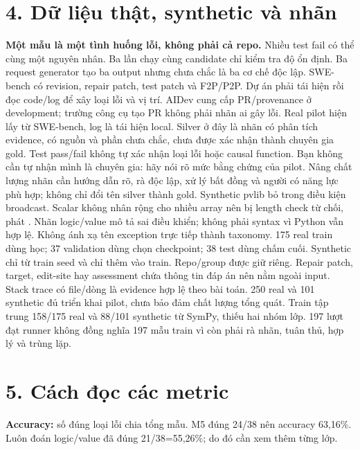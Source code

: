 \documentclass[12pt,a4paper]{article}
\begin{document}
\section*{4. Dữ liệu thật, synthetic và nhãn}
\textbf{Một mẫu là một tình huống lỗi, không phải cả repo.} Nhiều test fail có thể cùng một nguyên nhân. Ba lần chạy cùng candidate chỉ kiểm tra độ ổn định. Ba request generator tạo ba output nhưng chưa chắc là ba cơ chế độc lập.
SWE-bench có revision, repair patch, test patch và F2P/P2P. Dự án phải tái hiện rồi đọc code/log để xây loại lỗi và vị trí. AIDev cung cấp PR/provenance ở development; trường công cụ tạo PR không phải nhãn ai gây lỗi. Real pilot hiện lấy từ SWE-bench, log là tái hiện local.
Silver ở đây là nhãn có phân tích evidence, có nguồn và phần chưa chắc, chưa được xác nhận thành chuyên gia gold. Test pass/fail không tự xác nhận loại lỗi hoặc causal function. Bạn không cần tự nhận mình là chuyên gia: hãy nói rõ mức bằng chứng của pilot. Nâng chất lượng nhãn cần hướng dẫn rõ, rà độc lập, xử lý bất đồng và người có năng lực phù hợp; không chỉ đổi tên silver thành gold.
Synthetic pvlib bỏ  trong điều kiện broadcast. Scalar không nhân rộng cho nhiều array nên bị length check từ chối, phát . Nhãn logic/value mô tả sai điều khiển; không phải syntax vì Python vẫn hợp lệ. Không ánh xạ tên exception trực tiếp thành taxonomy.
175 real train dùng học; 37 validation dùng chọn checkpoint; 38 test dùng chấm cuối. Synthetic chỉ từ train seed và chỉ thêm vào train. Repo/group được giữ riêng. Repair patch, target, edit-site hay assessment chứa thông tin đáp án nên nằm ngoài input. Stack trace có file/dòng là evidence hợp lệ theo bài toán.
250 real và 101 synthetic đủ triển khai pilot, chưa bảo đảm chất lượng tổng quát. Train tập trung 158/175 real và 88/101 synthetic từ SymPy, thiếu hai nhóm lớp. 197 lượt đạt runner không đồng nghĩa 197 mẫu train vì còn phải rà nhãn, tuân thủ, hợp lý và trùng lặp.

\nextpage
\section*{5. Cách đọc các metric}
\textbf{Accuracy:} số đúng loại lỗi chia tổng mẫu. M5 đúng 24/38 nên accuracy 63,16\%. Luôn đoán logic/value đã đúng 21/38=55,26\%; do đó cần xem thêm từng lớp.
\end{document}
